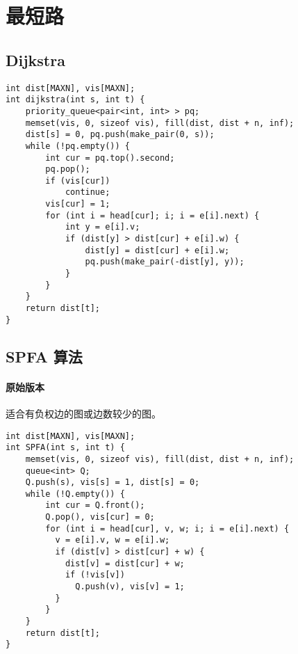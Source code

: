 \section{最短路}

\subsection{Dijkstra}
\begin{verbatim}
int dist[MAXN], vis[MAXN];
int dijkstra(int s, int t) {
    priority_queue<pair<int, int> > pq;
    memset(vis, 0, sizeof vis), fill(dist, dist + n, inf);
    dist[s] = 0, pq.push(make_pair(0, s));
    while (!pq.empty()) {
        int cur = pq.top().second;
        pq.pop(); 
        if (vis[cur])
            continue;
        vis[cur] = 1;
        for (int i = head[cur]; i; i = e[i].next) {
            int y = e[i].v;
            if (dist[y] > dist[cur] + e[i].w) {
                dist[y] = dist[cur] + e[i].w;
                pq.push(make_pair(-dist[y], y));
            }
        }
    }
    return dist[t];
}
\end{verbatim}

\subsection{SPFA 算法}
\paragraph{原始版本} 适合有负权边的图或边数较少的图。
\begin{verbatim}
int dist[MAXN], vis[MAXN];
int SPFA(int s, int t) {
    memset(vis, 0, sizeof vis), fill(dist, dist + n, inf);
    queue<int> Q;
    Q.push(s), vis[s] = 1, dist[s] = 0;
    while (!Q.empty()) {
        int cur = Q.front();
        Q.pop(), vis[cur] = 0;  
        for (int i = head[cur], v, w; i; i = e[i].next) {
          v = e[i].v, w = e[i].w;
          if (dist[v] > dist[cur] + w) {
            dist[v] = dist[cur] + w;
            if (!vis[v])
              Q.push(v), vis[v] = 1;
          }
        }
    }
    return dist[t];
}
\end{verbatim}

